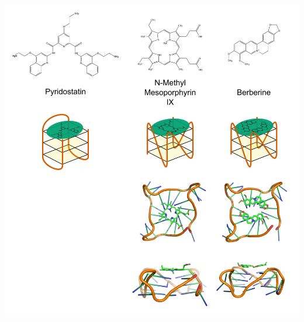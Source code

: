 \documentclass[12pt,a4paper,]{report}
\let\origfigure=\figure
\let\endorigfigure=\endfigure
\renewenvironment{figure}[1][2] {
    \expandafter\origfigure\expandafter[H]
} {
    \endorigfigure
}
\begin{document}
\begin{figure}[htbp]
\centering
\includegraphics[width=\textwidth,height=562pt,keepaspectratio]{introduction/figures/drugs.png}
\caption[G-Quadruplex Stabilising Ligands]{\textbf{G-Quadruplex   Stabilising   Ligands}   Structures   and   mode   of   action   of   Pyridostatin   (a),   NMM   (b),   and   Berberine(c).   Crystal   structures   of   human   telomeric   DNA   (parallel   G4   form)   in   complex   with   NMM   and   Berberine   are   from   PDB   entries   4FXM   and   3R6R   respectively   (Nicoludis   et   al. 2012,   Bazzicalupi   et   al. 2013).   Potassium   ions   and   solvent   molecules   have   been   hidden   for   visualisation   purposes.   \label{drugs}}
\end{figure}

\newpage
\end{document}
